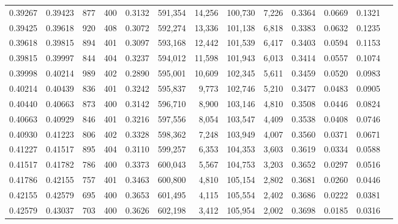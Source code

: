 \begin{tabular}{rrrrrrrrrrrrr}
0.39267 & 0.39423 &    877 & 400 &                                     0.3132 & 591,354 &  14,256 & 100,730 &   7,226 & 0.3364 & 0.0669 & 0.1321 \\
0.39425 & 0.39618 &    920 & 408 &                                     0.3072 & 592,274 &  13,336 & 101,138 &   6,818 & 0.3383 & 0.0632 & 0.1235 \\
0.39618 & 0.39815 &    894 & 401 &                                     0.3097 & 593,168 &  12,442 & 101,539 &   6,417 & 0.3403 & 0.0594 & 0.1153 \\
0.39815 & 0.39997 &    844 & 404 &                                     0.3237 & 594,012 &  11,598 & 101,943 &   6,013 & 0.3414 & 0.0557 & 0.1074 \\
0.39998 & 0.40214 &    989 & 402 &                                     0.2890 & 595,001 &  10,609 & 102,345 &   5,611 & 0.3459 & 0.0520 & 0.0983 \\
0.40214 & 0.40439 &    836 & 401 &                                     0.3242 & 595,837 &   9,773 & 102,746 &   5,210 & 0.3477 & 0.0483 & 0.0905 \\
0.40440 & 0.40663 &    873 & 400 &                                     0.3142 & 596,710 &   8,900 & 103,146 &   4,810 & 0.3508 & 0.0446 & 0.0824 \\
0.40663 & 0.40929 &    846 & 401 &                                     0.3216 & 597,556 &   8,054 & 103,547 &   4,409 & 0.3538 & 0.0408 & 0.0746 \\
0.40930 & 0.41223 &    806 & 402 &                                     0.3328 & 598,362 &   7,248 & 103,949 &   4,007 & 0.3560 & 0.0371 & 0.0671 \\
0.41227 & 0.41517 &    895 & 404 &                                     0.3110 & 599,257 &   6,353 & 104,353 &   3,603 & 0.3619 & 0.0334 & 0.0588 \\
0.41517 & 0.41782 &    786 & 400 &                                     0.3373 & 600,043 &   5,567 & 104,753 &   3,203 & 0.3652 & 0.0297 & 0.0516 \\
0.41786 & 0.42155 &    757 & 401 &                                     0.3463 & 600,800 &   4,810 & 105,154 &   2,802 & 0.3681 & 0.0260 & 0.0446 \\
0.42155 & 0.42579 &    695 & 400 &                                     0.3653 & 601,495 &   4,115 & 105,554 &   2,402 & 0.3686 & 0.0222 & 0.0381 \\
0.42579 & 0.43037 &    703 & 400 &                                     0.3626 & 602,198 &   3,412 & 105,954 &   2,002 & 0.3698 & 0.0185 & 0.0316 \\

\end{tabular}
